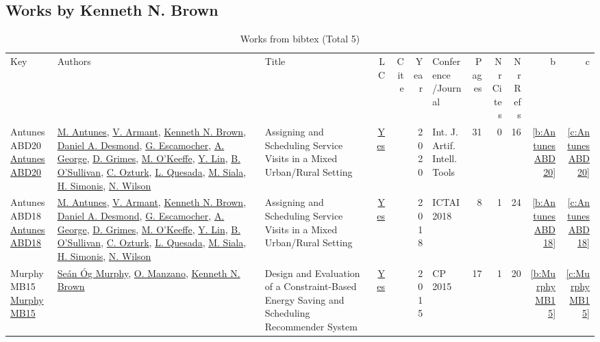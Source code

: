 \subsection{Works by Kenneth N. Brown}
\label{sec:a223}
{\scriptsize
\begin{longtable}{>{\raggedright\arraybackslash}p{3cm}>{\raggedright\arraybackslash}p{6cm}>{\raggedright\arraybackslash}p{6.5cm}rrrp{2.5cm}rrrrr}
\rowcolor{white}\caption{Works from bibtex (Total 5)}\\ \toprule
\rowcolor{white}Key & Authors & Title & LC & Cite & Year & \shortstack{Conference\\/Journal} & Pages & \shortstack{Nr\\Cites} & \shortstack{Nr\\Refs} & b & c \\ \midrule\endhead
\bottomrule
\endfoot
AntunesABD20 \href{https://doi.org/10.1142/S0218213020600076}{AntunesABD20} & \hyperref[auth:a891]{M. Antunes}, \hyperref[auth:a892]{V. Armant}, \hyperref[auth:a223]{Kenneth N. Brown}, \hyperref[auth:a893]{Daniel A. Desmond}, \hyperref[auth:a894]{G. Escamocher}, \hyperref[auth:a895]{A. George}, \hyperref[auth:a183]{D. Grimes}, \hyperref[auth:a896]{M. O'Keeffe}, \hyperref[auth:a897]{Y. Lin}, \hyperref[auth:a16]{B. O'Sullivan}, \hyperref[auth:a898]{C. Ozturk}, \hyperref[auth:a899]{L. Quesada}, \hyperref[auth:a130]{M. Siala}, \hyperref[auth:a17]{H. Simonis}, \hyperref[auth:a838]{N. Wilson} & Assigning and Scheduling Service Visits in a Mixed Urban/Rural Setting & \href{works/AntunesABD20.pdf}{Yes} & \cite{AntunesABD20} & 2020 & Int. J. Artif. Intell. Tools & 31 & 0 & 16 & \ref{b:AntunesABD20} & \ref{c:AntunesABD20}\\
AntunesABD18 \href{https://doi.org/10.1109/ICTAI.2018.00027}{AntunesABD18} & \hyperref[auth:a891]{M. Antunes}, \hyperref[auth:a892]{V. Armant}, \hyperref[auth:a223]{Kenneth N. Brown}, \hyperref[auth:a893]{Daniel A. Desmond}, \hyperref[auth:a894]{G. Escamocher}, \hyperref[auth:a895]{A. George}, \hyperref[auth:a183]{D. Grimes}, \hyperref[auth:a896]{M. O'Keeffe}, \hyperref[auth:a897]{Y. Lin}, \hyperref[auth:a16]{B. O'Sullivan}, \hyperref[auth:a898]{C. Ozturk}, \hyperref[auth:a899]{L. Quesada}, \hyperref[auth:a130]{M. Siala}, \hyperref[auth:a17]{H. Simonis}, \hyperref[auth:a838]{N. Wilson} & Assigning and Scheduling Service Visits in a Mixed Urban/Rural Setting & \href{works/AntunesABD18.pdf}{Yes} & \cite{AntunesABD18} & 2018 & ICTAI 2018 & 8 & 1 & 24 & \ref{b:AntunesABD18} & \ref{c:AntunesABD18}\\
MurphyMB15 \href{https://doi.org/10.1007/978-3-319-23219-5\_47}{MurphyMB15} & \hyperref[auth:a221]{Se{\'{a}}n {\'{O}}g Murphy}, \hyperref[auth:a222]{O. Manzano}, \hyperref[auth:a223]{Kenneth N. Brown} & Design and Evaluation of a Constraint-Based Energy Saving and Scheduling Recommender System & \href{works/MurphyMB15.pdf}{Yes} & \cite{MurphyMB15} & 2015 & CP 2015 & 17 & 1 & 20 & \ref{b:MurphyMB15} & \ref{c:MurphyMB15}\\

\end{longtable}}
